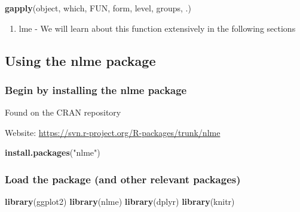 \documentclass[]{book}
\newenvironment{Shaded}{\begin{snugshade}}{\end{snugshade}}
\newcommand{\KeywordTok}[1]{\textcolor[rgb]{0.13,0.29,0.53}{\textbf{#1}}}
\newcommand{\NormalTok}[1]{#1}
\newcommand{\StringTok}[1]{\textcolor[rgb]{0.31,0.60,0.02}{#1}}
\providecommand{\tightlist}{%
  \setlength{\itemsep}{0pt}\setlength{\parskip}{0pt}}
\begin{document}
\begin{Shaded}
\begin{Highlighting}[]
\KeywordTok{gapply}\NormalTok{(object, which, FUN, form, level, groups, .)}
\end{Highlighting}
\end{Shaded}

\begin{enumerate}
\def\labelenumi{\arabic{enumi}.}
\setcounter{enumi}{3}
\tightlist
\item
  lme
  - We will learn about this function extensively in the following sections
\end{enumerate}

\hypertarget{using-the-nlme-package}{%
\subsection{Using the nlme package}\label{using-the-nlme-package}}

\hypertarget{begin-by-installing-the-nlme-package}{%
\subsubsection{Begin by installing the nlme package}\label{begin-by-installing-the-nlme-package}}

Found on the CRAN repository

Website: \url{https://svn.r-project.org/R-packages/trunk/nlme}

\begin{Shaded}
\begin{Highlighting}[]
\KeywordTok{install.packages}\NormalTok{(}\StringTok{"nlme"}\NormalTok{)}
\end{Highlighting}
\end{Shaded}

\hypertarget{load-the-package-and-other-relevant-packages}{%
\subsubsection{Load the package (and other relevant packages)}\label{load-the-package-and-other-relevant-packages}}

\begin{Shaded}
\begin{Highlighting}[]
\KeywordTok{library}\NormalTok{(ggplot2)}
\KeywordTok{library}\NormalTok{(nlme)}
\KeywordTok{library}\NormalTok{(dplyr)}
\KeywordTok{library}\NormalTok{(knitr)}
\end{Highlighting}
\end{Shaded}
\end{document}
